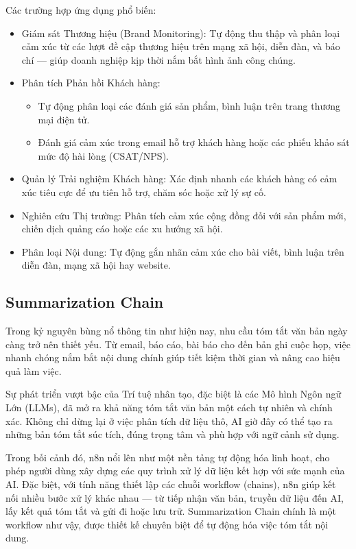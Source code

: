 Các trường hợp ứng dụng phổ biến:
\begin{itemize}
    \item Giám sát Thương hiệu (Brand Monitoring): Tự động thu thập và phân loại cảm xúc từ các lượt đề cập thương hiệu trên mạng xã hội, diễn đàn, và báo chí — giúp doanh nghiệp kịp thời nắm bắt hình ảnh công chúng.

    \item Phân tích Phản hồi Khách hàng:
\begin{itemize}
    \item Tự động phân loại các đánh giá sản phẩm, bình luận trên trang thương mại điện tử.
    \item Đánh giá cảm xúc trong email hỗ trợ khách hàng hoặc các phiếu khảo sát mức độ hài lòng (CSAT/NPS).
\end{itemize}

    \item Quản lý Trải nghiệm Khách hàng: Xác định nhanh các khách hàng có cảm xúc tiêu cực để ưu tiên hỗ trợ, chăm sóc hoặc xử lý sự cố.

    \item Nghiên cứu Thị trường: Phân tích cảm xúc cộng đồng đối với sản phẩm mới, chiến dịch quảng cáo hoặc các xu hướng xã hội.

    \item Phân loại Nội dung: Tự động gắn nhãn cảm xúc cho bài viết, bình luận trên diễn đàn, mạng xã hội hay website.

\end{itemize}


\subsection{Summarization Chain}
Trong kỷ nguyên bùng nổ thông tin như hiện nay, nhu cầu tóm tắt văn bản ngày càng trở nên thiết yếu. Từ email, báo cáo, bài báo cho đến bản ghi cuộc họp, việc nhanh chóng nắm bắt nội dung chính giúp tiết kiệm thời gian và nâng cao hiệu quả làm việc.

Sự phát triển vượt bậc của Trí tuệ nhân tạo, đặc biệt là các Mô hình Ngôn ngữ Lớn (LLMs), đã mở ra khả năng tóm tắt văn bản một cách tự nhiên và chính xác. Không chỉ dừng lại ở việc phân tích dữ liệu thô, AI giờ đây có thể tạo ra những bản tóm tắt súc tích, đúng trọng tâm và phù hợp với ngữ cảnh sử dụng.

Trong bối cảnh đó, n8n nổi lên như một nền tảng tự động hóa linh hoạt, cho phép người dùng xây dựng các quy trình xử lý dữ liệu kết hợp với sức mạnh của AI. Đặc biệt, với tính năng thiết lập các chuỗi workflow (chains), n8n giúp kết nối nhiều bước xử lý khác nhau — từ tiếp nhận văn bản, truyền dữ liệu đến AI, lấy kết quả tóm tắt và gửi đi hoặc lưu trữ. Summarization Chain chính là một workflow như vậy, được thiết kế chuyên biệt để tự động hóa việc tóm tắt nội dung.

